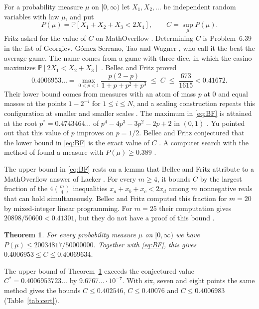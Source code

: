 \documentclass[11pt]{amsart}
\newtheorem{theorem}{Theorem}[section]
\theoremstyle{definition}
\theoremstyle{remark}
\numberwithin{equation}{section}
\newcommand{\Prob}{\mathbb{P}}
\newcommand{\BOUNDF}{20034817/50000000}
\newcommand{\BOUNDD}{0.40069634}
\newcommand{\GAPEXACT}{9.6767\ldots\cdot10^{-7}}
\begin{document}
For a probability measure $\mu$ on $[0,\infty)$ let $X_1,X_2,\dots$ be independent random variables with law $\mu$, and put
\[
P(\mu)=\Prob[X_1+X_2+X_3<2X_4],\qquad C=\sup_\mu P(\mu).
\]
Fritz asked for the value of $C$ on MathOverflow \cite{Fri24}. Determining $C$ is Problem~6.39 in the list of Georgiev, G\'omez-Serrano, Tao and Wagner \cite{GGTW25}, who call it the beat the average game. The name comes from a game with three dice, in which the casino maximizes $\Prob[2X_1<X_2+X_3]$ \cite[Section~1]{BF26}. Bellec and Fritz \cite{BF26} proved
\begin{equation}\label{eq:BF}
0.4006953\ldots=\max_{0<p<1}\frac{p(2-p)}{1+p+p^2+p^3}\;\le\; C\;\le\;\frac{673}{1615}<0.41672 .
\end{equation}
Their lower bound comes from measures with an atom of mass $p$ at $0$ and equal masses at the points $1-2^{-i}$ for $1\le i\le N$, and a scaling construction repeats this configuration at smaller and smaller scales \cite[Propositions~3.3 and~4.1]{BF26}. The maximum in \eqref{eq:BF} is attained at the root $p^*=0.4743464\ldots$ of $p^4-4p^3-3p^2-2p+2$ in $(0,1)$ \cite[Remark~4.2]{BF26}. Yu \cite{Yu24} pointed out that this value of $p$ improves on $p=1/2$. Bellec and Fritz conjectured that the lower bound in \eqref{eq:BF} is the exact value of $C$ \cite[Conjecture~5.1]{BF26}. A computer search with the method of \cite{AE25} found a measure with $P(\mu)\ge0.389$ \cite{GGTW25}.

The upper bound in \eqref{eq:BF} rests on a lemma that Bellec and Fritz attribute to a MathOverflow answer of Lacker \cite[Lemma~2.3]{BF26}. For every $m\ge4$, it bounds $C$ by the largest fraction of the $4\binom m4$ inequalities $x_a+x_b+x_c<2x_d$ among $m$ nonnegative reals that can hold simultaneously. Bellec and Fritz computed this fraction for $m=20$ by mixed-integer linear programming. For $m=25$ their computation gives $20898/50600<0.41301$, but they do not have a proof of this bound \cite[Section~4]{BF26}.

\begin{theorem}\label{thm:main}
For every probability measure $\mu$ on $[0,\infty)$ we have $P(\mu)\le\BOUNDF$. Together with \eqref{eq:BF}, this gives $0.4006953\le C\le\BOUNDD$.
\end{theorem}

The upper bound of Theorem~\ref{thm:main} exceeds the conjectured value $C^*=0.4006953723\ldots$ by $\GAPEXACT$. With six, seven and eight points the same method gives the bounds $C\le0.402546$, $C\le0.40076$ and $C\le0.4006983$ (Table~\ref{tab:cert}).
\end{document}
